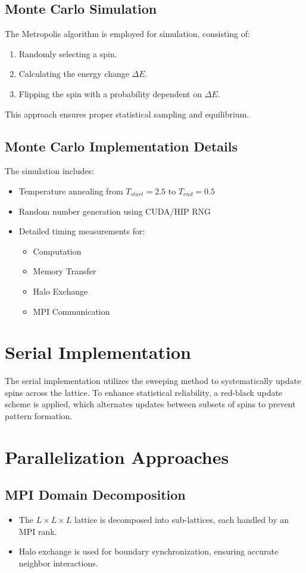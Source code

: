 \documentclass{article}
\begin{document}
\subsection{Monte Carlo Simulation}
The Metropolis algorithm is employed for simulation, consisting of:
\begin{enumerate}
    \item Randomly selecting a spin.
    \item Calculating the energy change $\Delta E$.
    \item Flipping the spin with a probability dependent on $\Delta E$.
\end{enumerate}
This approach ensures proper statistical sampling and equilibrium.

\subsection{Monte Carlo Implementation Details}
The simulation includes:
\begin{itemize}
    \item Temperature annealing from $T_{start}=2.5$ to $T_{end}=0.5$
    \item Random number generation using CUDA/HIP RNG
    \item Detailed timing measurements for:
    \begin{itemize}
        \item Computation
        \item Memory Transfer
        \item Halo Exchange
        \item MPI Communication
    \end{itemize}
\end{itemize}

\section{Serial Implementation}
The serial implementation utilizes the sweeping method to systematically update spins across the lattice. To enhance statistical reliability, a red-black update scheme is applied, which alternates updates between subsets of spins to prevent pattern formation.

\section{Parallelization Approaches}
\subsection{MPI Domain Decomposition}
\begin{itemize}
    \item The $L \times L \times L$ lattice is decomposed into sub-lattices, each handled by an MPI rank.
    \item Halo exchange is used for boundary synchronization, ensuring accurate neighbor interactions.
\end{itemize}
\end{document}
